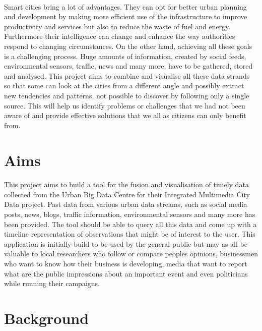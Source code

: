 \documentclass{l4proj}
\begin{document}
\paragraph{}
Smart cities bring a lot of advantages. They can opt for better urban planning and development by making more efficient use of the infrastructure to improve productivity and services but also to reduce the waste of fuel and energy. Furthermore their intelligence can change and enhance the way authorities respond to changing circumstances. On the other hand, achieving all these goals is a challenging process. Huge amounts of information, created by social feeds, environmental sensors, traffic, news and many more, have to be gathered, stored and analysed. This project aims to combine and visualise all these data strands so that some can look at the cities from a different angle and possibly extract new tendencies and patterns, not possible to discover by following only a single source. This will help us identify problems or challenges that we had not been aware of and provide effective solutions that we all as citizens can only benefit from.

\section{Aims}
\label{sec:aims}
\paragraph{}
This project aims to build a tool for the fusion and visualisation of timely data collected from the Urban Big Data Centre for their Integrated Multimedia City Data project. Past data from various urban data streams, such as social media posts, news, blogs, traffic information, environmental sensors and many more has been provided. The tool should be able to query all this data and come up with a timeline representation of observations that might be of interest to the user. This application is initially build to be used by the general public but may as all be valuable to local researchers who follow or compare people\textquotesingle s opinions, businessmen who want to know how their business is developing, media that want to report what are the public impressions about an important event and even politicians while running their campaigns.   

\section{Background}
\end{document}
